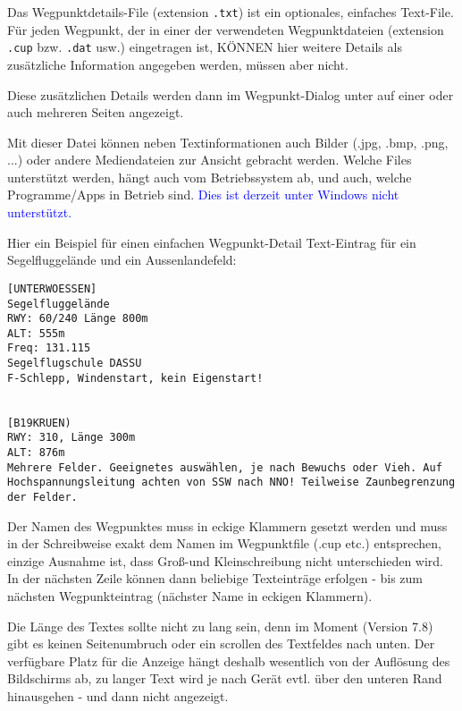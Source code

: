 %
%
%

Das Wegpunktdetails-File (extension \verb|.txt|) ist ein optionales, einfaches Text-File. Für jeden Wegpunkt, der in einer der verwendeten Wegpunktdateien (extension \verb|.cup| bzw. \verb|.dat| usw.) eingetragen ist, KÖNNEN hier weitere Details als zusätzliche Information angegeben werden, müssen aber nicht. 

Diese zusätzlichen Details werden dann im Wegpunkt-Dialog unter  auf einer oder auch mehreren Seiten angezeigt.

Mit dieser Datei können neben Textinformationen auch Bilder (.jpg, .bmp, .png, ...) oder andere Mediendateien zur Ansicht gebracht werden. Welche Files unterstützt werden, hängt auch vom Betriebssystem ab, und auch, welche Programme/Apps in Betrieb sind. \textcolor{blue}{Dies ist derzeit unter Windows nicht unterstützt.} 

Hier ein Beispiel für einen einfachen Wegpunkt-Detail Text-Eintrag für ein Segelfluggelände und ein
Aussenlandefeld:

\begin{verbatim}
[UNTERWOESSEN]
Segelfluggelände
RWY: 60/240 Länge 800m
ALT: 555m
Freq: 131.115
Segelflugschule DASSU 
F-Schlepp, Windenstart, kein Eigenstart!


[B19KRUEN)
RWY: 310, Länge 300m
ALT: 876m
Mehrere Felder. Geeignetes auswählen, je nach Bewuchs oder Vieh. Auf Hochspannungsleitung achten von SSW nach NNO! Teilweise Zaunbegrenzung der Felder.
\end{verbatim}



Der Namen des Wegpunktes muss in eckige Klammern gesetzt werden und muss in der Schreibweise exakt dem Namen im Wegpunktfile (.cup etc.) entsprechen, einzige Ausnahme ist, dass Groß-und Kleinschreibung nicht unterschieden wird.
In der nächsten Zeile können dann beliebige Texteinträge erfolgen - bis zum nächsten Wegpunkteintrag (nächster Name in eckigen Klammern).

Die Länge des Textes sollte nicht zu lang sein, denn im Moment (Version 7.8) gibt es keinen Seitenumbruch oder ein scrollen des Textfeldes nach unten. Der verfügbare Platz für die Anzeige hängt deshalb wesentlich von der Auflösung des Bildschirms ab, zu langer Text wird je nach Gerät evtl. über den unteren Rand hinausgehen - und dann nicht angezeigt.


